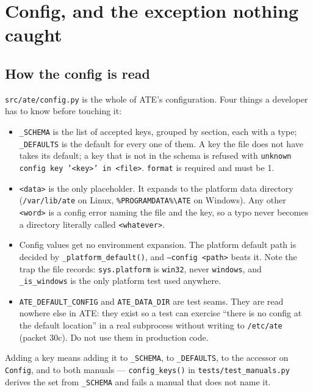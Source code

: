 \chapter{Config, and the exception nothing caught}\label{ch:config}

\section{How the config is read}

\texttt{src/ate/config.py} is the whole of ATE's configuration. Four things a developer has to know
before touching it:

\begin{itemize}
  \item \texttt{\_SCHEMA} is the list of accepted keys, grouped by section, each with a type;
    \texttt{\_DEFAULTS} is the default for every one of them. A key the file does not have takes its
    default; a key that is not in the schema is refused with \texttt{unknown config key '<key>' in
    <file>}. \texttt{format} is required and must be 1.
  \item \texttt{<data>} is the only placeholder. It expands to the platform data directory
    (\texttt{/var/lib/ate} on Linux, \texttt{\%PROGRAMDATA\%\textbackslash ATE} on Windows). Any other
    \texttt{<word>} is a config error naming the file and the key, so a typo never becomes a directory
    literally called \texttt{<whatever>}.
  \item Config values get no environment expansion. The platform default path is decided by
    \texttt{\_\allowbreak{}platform\_\allowbreak{}default()}, and \texttt{--config <path>} beats it. Note the trap the file records:
    \texttt{sys.platform} is \texttt{win32}, never \texttt{windows}, and \texttt{\_is\_windows} is the only
    platform test used anywhere.
  \item \texttt{ATE\_DEFAULT\_CONFIG} and \texttt{ATE\_DATA\_DIR} are test seams. They are read nowhere
    else in ATE: they exist so a test can exercise ``there is no config at the default location'' in a
    real subprocess without writing to \texttt{/etc/ate} (packet 30c). Do not use them in production code.
\end{itemize}

Adding a key means adding it to \texttt{\_SCHEMA}, to \texttt{\_DEFAULTS}, to the accessor on
\texttt{Config}, and to both manuals --- \texttt{config\_keys()} in \texttt{tests/\allowbreak{}test\_\allowbreak{}manuals.py}
derives the set from \texttt{\_SCHEMA} and fails a manual that does not name it.

